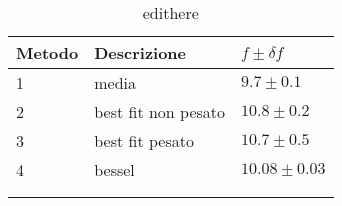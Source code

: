 \begin{longtable}{@{}lll@{}}
\toprule
Metodo & Descrizione & $f \pm \delta f$ \tabularnewline
\midrule
1 & media & $9.7 \pm 0.1$ \tabularnewline
2 & best fit non pesato & $10.8 \pm 0.2$ \tabularnewline
3 & best fit pesato & $10.7 \pm 0.5$ \tabularnewline
4 & bessel & $10.08 \pm 0.03$ \tabularnewline
\bottomrule
\label{tab:edithere}
\\
\caption{edithere}
\end{longtable}
